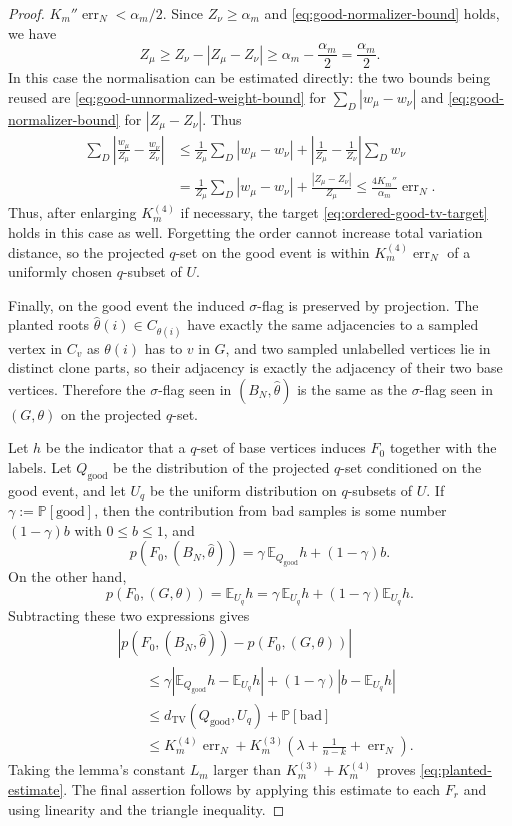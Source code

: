 \documentclass[11pt]{article}
\theoremstyle{definition}
\newcommand{\E}{\mathbb{E}}
\newcommand{\Prob}{\mathbb{P}}
\begin{document}
\begin{proof}
$K_m''\operatorname{err}_N<\alpha_m/2$.  Since $Z_\nu\ge\alpha_m$ and
\eqref{eq:good-normalizer-bound} holds, we have
\[
  Z_\mu
  \ge
  Z_\nu-|Z_\mu-Z_\nu|
  \ge
  \alpha_m-\frac{\alpha_m}{2}
  =
  \frac{\alpha_m}{2}.
\]
In this case the normalisation can be estimated directly:
the two bounds being reused are
\eqref{eq:good-unnormalized-weight-bound} for $\sum_D|w_\mu-w_\nu|$ and
\eqref{eq:good-normalizer-bound} for $|Z_\mu-Z_\nu|$.  Thus
\[
\begin{aligned}
  \sum_D\left|\frac{w_\mu}{Z_\mu}-\frac{w_\nu}{Z_\nu}\right|
  &\le
  \frac1{Z_\mu}\sum_D|w_\mu-w_\nu|
  +
  \left|\frac1{Z_\mu}-\frac1{Z_\nu}\right|\sum_D w_\nu  \\
  &=
  \frac1{Z_\mu}\sum_D|w_\mu-w_\nu|
  +
  \frac{|Z_\mu-Z_\nu|}{Z_\mu}
  \le
  \frac{4K_m''}{\alpha_m}\operatorname{err}_N .
\end{aligned}
\]
Thus, after enlarging $K_m^{(4)}$ if necessary, the target
\eqref{eq:ordered-good-tv-target} holds in this case as well.
Forgetting the order cannot increase total variation distance, so the projected
$q$-set on the good event is within $K_m^{(4)}\operatorname{err}_N$ of a
uniformly chosen $q$-subset of $U$.

Finally, on the good event the induced $\sigma$-flag is preserved by projection.
The planted roots $\widehat\theta(i)\in C_{\theta(i)}$ have exactly the same
adjacencies to a sampled vertex in $C_v$ as $\theta(i)$ has to $v$ in $G$, and
two sampled unlabelled vertices lie in distinct clone parts, so their adjacency
is exactly the adjacency of their two base vertices.  Therefore the $\sigma$-flag
seen in $(B_N,\widehat\theta)$ is the same as the $\sigma$-flag seen in
$(G,\theta)$ on the projected $q$-set.

Let $h$ be the indicator that a $q$-set of base vertices induces $F_0$ together
with the labels.  Let $Q_{\mathrm{good}}$ be the distribution of the projected
$q$-set conditioned on the good event, and let $U_q$ be the uniform distribution
on $q$-subsets of $U$.  If $\gamma:=\Prob[\text{good}]$, then the contribution
from bad samples is some number $(1-\gamma)b$ with $0\le b\le1$, and
\[
  p(F_0,(B_N,\widehat\theta))
  =
  \gamma\,\E_{Q_{\mathrm{good}}}h+(1-\gamma)b .
\]
On the other hand,
\[
  p(F_0,(G,\theta))
  =
  \E_{U_q}h
  =
  \gamma\,\E_{U_q}h+(1-\gamma)\E_{U_q}h .
\]
Subtracting these two expressions gives
\[
\begin{aligned}
&\left|p(F_0,(B_N,\widehat\theta))-p(F_0,(G,\theta))\right| \\
&\qquad\le
  \gamma\left|\E_{Q_{\mathrm{good}}}h-\E_{U_q}h\right|
  +(1-\gamma)\left|b-\E_{U_q}h\right| \\
&\qquad\le
  d_{\mathrm{TV}}(Q_{\mathrm{good}},U_q)+\Prob[\text{bad}]  \\
&\qquad\le
  K_m^{(4)}\operatorname{err}_N
  +
  K_m^{(3)}\left(\lambda+\frac1{n-k}+\operatorname{err}_N\right).
\end{aligned}
\]
Taking the lemma's constant $L_m$ larger than $K_m^{(3)}+K_m^{(4)}$ proves
\eqref{eq:planted-estimate}.  The final assertion follows by applying this
estimate to each $F_r$ and using linearity and the triangle inequality.
\end{proof}
\end{document}
